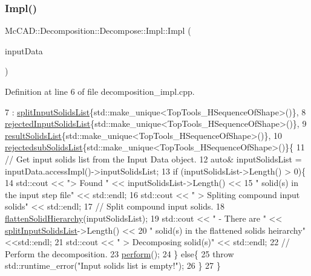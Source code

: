 \subsubsection{\texorpdfstring{Impl()}{Impl()}\hspace{0.1cm}{\footnotesize\ttfamily [1/2]}}
{\footnotesize\ttfamily Mc\+C\+A\+D\+::\+Decomposition\+::\+Decompose\+::\+Impl\+::\+Impl (\begin{DoxyParamCaption}\item[{const \hyperlink{classMcCAD_1_1General_1_1InputData}{General\+::\+Input\+Data} \&}]{input\+Data }\end{DoxyParamCaption})}



Definition at line 6 of file decomposition\+\_\+impl.\+cpp.


\begin{DoxyCode}
7   : \hyperlink{classMcCAD_1_1Decomposition_1_1Decompose_1_1Impl_a9da06719a71fdc8438190a3c3112e82b}{splitInputSolidsList}\{std::make\_unique<TopTools\_HSequenceOfShape>()\},
8     \hyperlink{classMcCAD_1_1Decomposition_1_1Decompose_1_1Impl_afa4c71b9552009320911095b0e9c638e}{rejectedInputSolidsList}\{std::make\_unique<TopTools\_HSequenceOfShape>()\},
9     \hyperlink{classMcCAD_1_1Decomposition_1_1Decompose_1_1Impl_a75b53d768ed797dff26c6bf7308f0bea}{resultSolidsList}\{std::make\_unique<TopTools\_HSequenceOfShape>()\},
10     \hyperlink{classMcCAD_1_1Decomposition_1_1Decompose_1_1Impl_a513935cebc47e2e4dd599963bfbb8008}{rejectedsubSolidsList}\{std::make\_unique<TopTools\_HSequenceOfShape>()\}\{
11   \textcolor{comment}{// Get input solids list from the Input Data object.}
12   \textcolor{keyword}{auto}& inputSolidsList = inputData.accessImpl()->inputSolidsList;
13   \textcolor{keywordflow}{if} (inputSolidsList->Length() > 0)\{
14       std::cout << \textcolor{stringliteral}{"> Found "} << inputSolidsList->Length() <<
15                    \textcolor{stringliteral}{" solid(s) in the input step file"} << std::endl;
16       std::cout << \textcolor{stringliteral}{" > Spliting compound input solids"} << std::endl;
17       \textcolor{comment}{// Split compound input solids.}
18       \hyperlink{classMcCAD_1_1Decomposition_1_1Decompose_1_1Impl_ab0605ffa40a113571d949c93e5994122}{flattenSolidHierarchy}(inputSolidsList);
19       std::cout << \textcolor{stringliteral}{"   - There are "} << \hyperlink{classMcCAD_1_1Decomposition_1_1Decompose_1_1Impl_a9da06719a71fdc8438190a3c3112e82b}{splitInputSolidsList}->Length() <<
20                    \textcolor{stringliteral}{" solid(s) in the flattened solids heirarchy"} <<std::endl;
21       std::cout << \textcolor{stringliteral}{" > Decomposing solid(s)"} << std::endl;
22       \textcolor{comment}{// Perform the decomposition.}
23       \hyperlink{classMcCAD_1_1Decomposition_1_1Decompose_1_1Impl_a71700a5c5ec1eaa1b414cb232d1a073b}{perform}();
24     \} \textcolor{keywordflow}{else}\{
25       \textcolor{keywordflow}{throw} std::runtime\_error(\textcolor{stringliteral}{"Input solids list is empty!"});
26     \}
27 \}
\end{DoxyCode}
